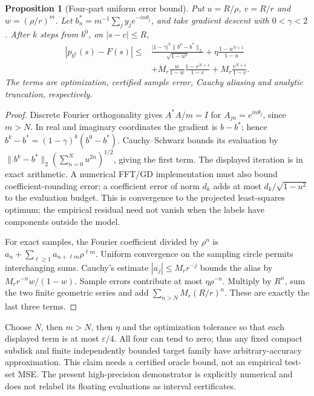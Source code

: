 \documentclass[11pt]{article}
\newtheorem{proposition}[theorem]{Proposition}
\theoremstyle{definition}\newtheorem{definition}[theorem]{Definition}
\theoremstyle{remark}\newtheorem{remark}[theorem]{Remark}
\begin{document}
\begin{proposition}[Four-part uniform error bound]\label{hl:finite}
Put $u=R/\rho$, $v=R/r$ and $w=(\rho/r)^m$. Let
$b_n^*=m^{-1}\sum_jy_je^{-in\theta_j}$, and take gradient descent with
$0<\gamma<2$. After $k$ steps from $b^0$, on $|s-c|\le R$,
\[
 \begin{split}
 |p_{b^k}(s)-F(s)|\le{}&
 \frac{|1-\gamma|^k\|b^0-b^*\|_2}{\sqrt{1-u^2}}
 +\eta\frac{1-u^{N+1}}{1-u}\\
 &+M_r\frac{w}{1-w}\frac{1-v^{N+1}}{1-v}
 +M_r\frac{v^{N+1}}{1-v}.
 \end{split}
\]
The terms are optimization, certified sample error, Cauchy aliasing and
analytic truncation, respectively.
\end{proposition}
\begin{proof}
Discrete Fourier orthogonality gives $A^*A/m=I$ for
$A_{jn}=e^{in\theta_j}$, since $m>N$. In real and imaginary coordinates the
gradient is $b-b^*$; hence
$b^k-b^*=(1-\gamma)^k(b^0-b^*)$. Cauchy--Schwarz bounds its evaluation by
$\|b^k-b^*\|_2(\sum_{n=0}^Nu^{2n})^{1/2}$, giving the first term.
The displayed iteration is in exact arithmetic. A numerical FFT/GD implementation
must also bound coefficient-rounding error; a coefficient error of norm $d_k$
adds at most $d_k/\sqrt{1-u^2}$ to the evaluation budget.
This is convergence to the projected least-squares optimum; the empirical
residual need not vanish when the labels have components outside the model.

For exact samples, the Fourier coefficient divided by $\rho^n$ is
$a_n+\sum_{\ell\ge1}a_{n+\ell m}\rho^{\ell m}$.
Uniform convergence on the sampling circle permits interchanging sums.
Cauchy's estimate $|a_j|\le M_rr^{-j}$ bounds the alias by
$M_rr^{-n}w/(1-w)$. Sample errors contribute at most $\eta\rho^{-n}$.
Multiply by $R^n$, sum the two finite geometric series and add
$\sum_{n>N}M_r(R/r)^n$. These are exactly the last three terms.
\end{proof}

Choose $N$, then $m>N$, then $\eta$ and the optimization tolerance so that
each displayed term is at most $\varepsilon/4$. All four can tend to zero;
thus any fixed compact subdisk and finite independently bounded target family
have arbitrary-accuracy approximation. This claim needs a certified oracle
bound, not an empirical test-set MSE. The present high-precision demonstrator
is explicitly numerical and does not relabel its floating evaluations as
interval certificates.
\end{document}
